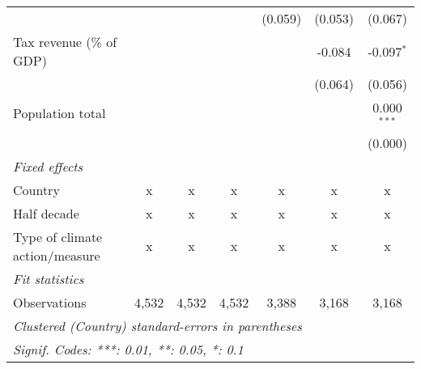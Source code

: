 \begin{tabular}{lcccccc}
                                                                    &         &         &               & (0.059)       & (0.053)      & (0.067)\\   
   Tax revenue (\% of GDP)                                          &         &         &               &               & -0.084       & -0.097$^{*}$\\   
                                                                    &         &         &               &               & (0.064)      & (0.056)\\   
   Population total                                                 &         &         &               &               &              & 0.000$^{***}$\\   
                                                                    &         &         &               &               &              & (0.000)\\   
   \emph{Fixed effects}\\
   Country                                                          & x       & x       & x             & x             & x            & x\\  
   Half decade                                                      & x       & x       & x             & x             & x            & x\\  
   Type of climate action/measure                                   & x       & x       & x             & x             & x            & x\\  
   \midrule \emph{Fit statistics}\\
   Observations                                                     & 4,532   & 4,532   & 4,532         & 3,388         & 3,168        & 3,168\\  
   \midrule
   \multicolumn{7}{l}{\emph{Clustered (Country) standard-errors in parentheses}}\\
   \multicolumn{7}{l}{\emph{Signif. Codes: ***: 0.01, **: 0.05, *: 0.1}}\\
\end{tabular}
\par\endgroup


